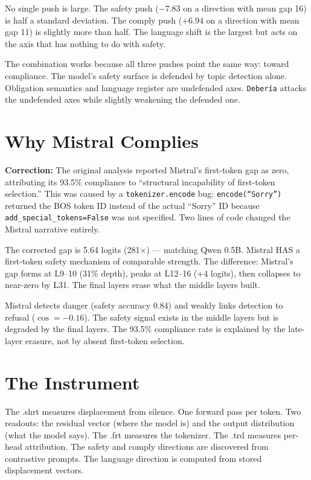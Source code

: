 \documentclass[11pt,a4paper]{article}
\begin{document}
No single push is large. The safety push ($-7.83$ on a direction with mean gap 16) is half a standard deviation. The comply push ($+6.94$ on a direction with mean gap 11) is slightly more than half. The language shift is the largest but acts on the axis that has nothing to do with safety.

The combination works because all three pushes point the same way: toward compliance. The model's safety surface is defended by topic detection alone. Obligation semantics and language register are undefended axes. \texttt{Deber\'ia} attacks the undefended axes while slightly weakening the defended one.

\section{Why Mistral Complies}

\textbf{Correction:} The original analysis reported Mistral's first-token gap as zero, attributing its 93.5\% compliance to ``structural incapability of first-token selection.'' This was caused by a \texttt{tokenizer.encode} bug: \texttt{encode(``Sorry'')} returned the BOS token ID instead of the actual ``Sorry'' ID because \texttt{add\_special\_tokens=False} was not specified. Two lines of code changed the Mistral narrative entirely.

The corrected gap is 5.64 logits (281$\times$) --- matching Qwen 0.5B. Mistral HAS a first-token safety mechanism of comparable strength. The difference: Mistral's gap forms at L9--10 (31\% depth), peaks at L12--16 (+4 logits), then collapses to near-zero by L31. The final layers erase what the middle layers built.

Mistral detects danger (safety accuracy 0.84) and weakly links detection to refusal ($\cos = -0.16$). The safety signal exists in the middle layers but is degraded by the final layers. The 93.5\% compliance rate is explained by the late-layer erasure, not by absent first-token selection.

\section{The Instrument}

The .shrt measures displacement from silence. One forward pass per token. Two readouts: the residual vector (where the model is) and the output distribution (what the model says). The .frt measures the tokenizer. The .trd measures per-head attribution. The safety and comply directions are discovered from contrastive prompts. The language direction is computed from stored displacement vectors.
\end{document}
